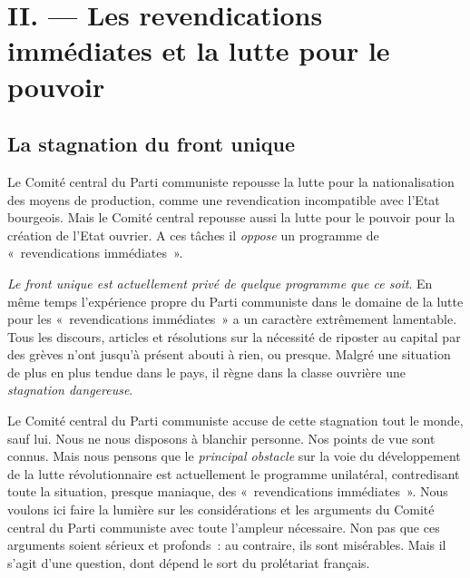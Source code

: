 \documentclass[french,twoside]{book} %
\begin{document}
\section[{II. — Les revendications immédiates et la lutte pour le pouvoir}]{II. — Les revendications immédiates et la lutte pour le pouvoir}
\subsection[{La stagnation du front unique}]{La stagnation du front unique}
\noindent Le Comité central du Parti communiste repousse la lutte pour la nationalisation des moyens de production, comme une revendication incompatible avec l’Etat bourgeois. Mais le Comité central repousse aussi la lutte pour le pouvoir pour la création de l’Etat ouvrier. A ces tâches il \emph{oppose} un programme de « revendications immédiates ».\par
\emph{Le front unique est actuellement privé de quelque programme que ce soit}. En même temps l’expérience propre du Parti communiste dans le domaine de la lutte pour les « revendications immédiates » a un caractère extrêmement lamentable. Tous les discours, articles et résolutions sur la nécessité de riposter au capital par des grèves n’ont  jusqu’à présent abouti à rien, ou presque. Malgré une situation de plus en plus tendue dans le pays, il règne dans la classe ouvrière une \emph{stagnation dangereuse}.\par
Le Comité central du Parti communiste accuse de cette stagnation tout le monde, sauf lui. Nous ne nous disposons à blanchir personne. Nos points de vue sont connus. Mais nous pensons que le \emph{principal obstacle} sur la voie du développement de la lutte révolutionnaire est actuellement le programme unilatéral, contredisant toute la situation, presque maniaque, des « revendications immédiates ». Nous voulons ici faire la lumière sur les considérations et les arguments du Comité central du Parti communiste avec toute l’ampleur nécessaire. Non pas que ces arguments soient sérieux et profonds : au contraire, ils sont misérables. Mais il s’agit d’une question, dont dépend le sort du prolétariat français.
\end{document}
